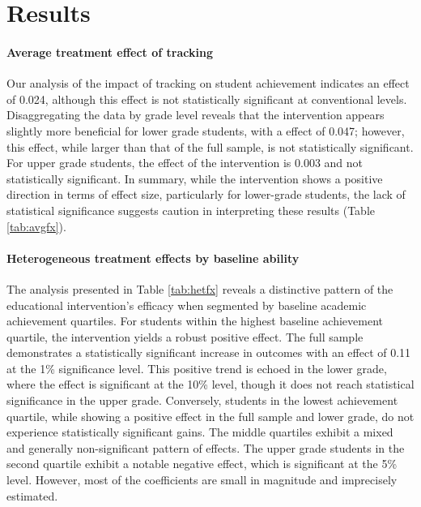 \documentclass[12pt]{article}
\begin{document}
\section*{Results}
\label{sec:results}

\paragraph{Average treatment effect of tracking}
Our analysis of the impact of tracking on student achievement indicates an effect of 0.024, although this effect is not statistically significant at conventional levels. Disaggregating the data by grade level reveals that the intervention appears slightly more beneficial for lower grade students, with a effect of 0.047; however, this effect, while larger than that of the full sample, is not statistically significant. For upper grade students, the effect of the intervention is 0.003 and not statistically significant. In summary, while the intervention shows a positive direction in terms of effect size, particularly for lower-grade students, the lack of statistical significance suggests caution in interpreting these results (Table \ref{tab:avgfx}). 

\paragraph{Heterogeneous treatment effects by baseline ability}
The analysis presented in Table \ref{tab:hetfx} reveals a distinctive pattern of the educational intervention's efficacy when segmented by baseline academic achievement quartiles. For students within the highest baseline achievement quartile, the intervention yields a robust positive effect. The full sample demonstrates a statistically significant increase in outcomes with an effect of 0.11 at the 1\% significance level. This positive trend is echoed in the lower grade, where the effect is significant at the 10\% level, though it does not reach statistical significance in the upper grade. Conversely, students in the lowest achievement quartile, while showing a positive effect in the full sample and lower grade, do not experience statistically significant gains. The middle quartiles exhibit a mixed and generally non-significant pattern of effects. The upper grade students in the second quartile exhibit a notable negative effect, which is significant at the 5\% level. However, most of the coefficients are small in magnitude and imprecisely estimated.
\end{document}
